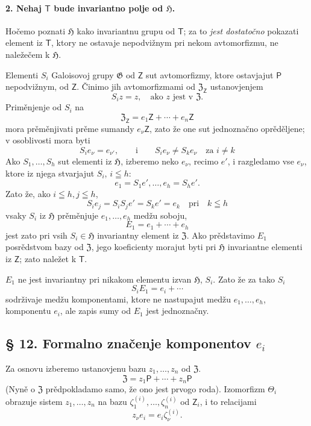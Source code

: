 \documentclass[11pt]{article}
\begin{document}
\paragraph{2. Nehaj \(\mathsf T\) bude invariantno polje od \(\mathfrak H\).}
Hočemo poznati \(\mathfrak H\) kako invariantnu grupu od \(\mathsf T\); za to \emph{jest dostatočno} pokazati element iz \(\mathsf T\), ktory ne ostavaje nepodvižnym pri nekom avtomorfizmu, ne naležečem k \(\mathfrak H\).

Elementi \(S_i\) Galoisovoj grupy \(\mathfrak G\) od \(\mathsf Z\) sut avtomorfizmy, ktore ostavjajut \(\mathsf P\) nepodvižnym, od \(\mathsf Z\). Činimo jih avtomorfizmami od \(\mathfrak Z_{\mathsf Z}\) ustanovjenjem
\[
S_i z=z,\quad \text{ako } z \text{ jest v } \mathfrak Z.
\]
Priměnjenje od \(S_i\) na
\[
\mathfrak Z_{\mathsf Z}=e_1\mathsf Z+\cdots+e_n\mathsf Z
\]
mora prěměnjivati prěme sumandy \(e_\nu\mathsf Z\), zato že one sut jednoznačno oprěděljene; v osoblivosti mora byti
\[
S_i e_\nu=e_{\nu'},\qquad\text{i}\qquad S_i e_\nu\ne S_k e_\nu
\quad\text{za } i\ne k
\]
Ako \(S_1,\ldots,S_h\) sut elementi iz \(\mathfrak H\), izberemo neko \(e_\nu\), recimo \(e'\), i razgledamo vse \(e_\nu\), ktore iz njega stvarjajut \(S_i\), \(i\leqq h\):
\[
e_1=S_1e',\ldots,e_h=S_he'.
\]
Zato že, ako \(i\leqq h, j\leqq h\),
\[
S_i e_j=S_iS_j e'=S_ke'=e_k \quad \text{pri}\quad k\leqq h
\]
vsaky \(S_i\) iz \(\mathfrak H\) prěměnjuje \(e_1,\ldots,e_h\) medžu soboju,
\[
E_1=e_1+\cdots+e_h
\]
jest zato pri vsih \(S_i\in\mathfrak H\) invariantny element iz \(\mathfrak Z\). Ako prědstavimo \(E_1\) posrědstvom bazy od \(\mathfrak Z\), jego koeficienty morajut byti pri \(\mathfrak H\) invariantne elementi iz \(\mathsf Z\); zato naležet k \(\mathsf T\).

\(E_1\) ne jest invariantny pri nikakom elementu izvan \(\mathfrak H\), \(S_i\). Zato že za tako \(S_i\)
\[
S_i E_1=e_i+\cdots
\]
sodrživaje medžu komponentami, ktore ne nastupajut medžu \(e_1,\ldots,e_h\), komponentu \(e_i\), ale zapis sumy od \(E_1\) jest jednoznačny.

\subsection*{§ 12. Formalno značenje komponentov \(e_i\)}\label{die-formale-bedeutung-der-komponenten-ei}

Za osnovu izberemo ustanovjenu bazu \(z_1,\ldots,z_n\) od \(\mathfrak Z\).
\[
\mathfrak Z=z_1\mathsf P+\cdots+z_n\mathsf P
\]
(Nyně o \(\mathfrak Z\) prědpokladamo samo, že ono jest prvogo roda). Izomorfizm \(\Theta_i\) obrazuje sistem \(z_1,\ldots,z_n\) na bazu \(\zeta_1^{(i)},\ldots,\zeta_n^{(i)}\) od \(\mathsf Z_i\), i to relacijami
\[
z_\nu e_i=e_i\zeta_\nu^{(i)} .
\]
\end{document}
